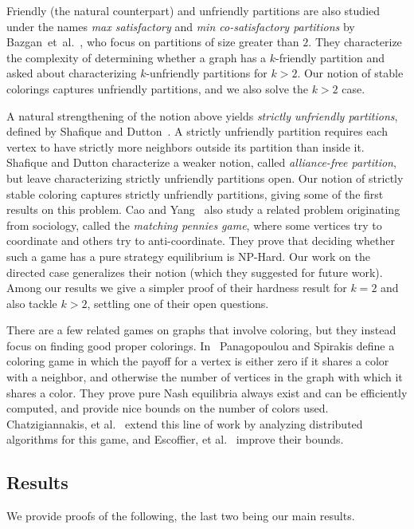 \documentclass{llncs}
\begin{document}
Friendly (the natural counterpart) and unfriendly partitions are also studied
under the names \emph{max satisfactory} and \emph{min co-satisfactory
partitions} by Bazgan~et~al.~\cite{BazganTV10}, who focus on partitions of
size greater than $2$.  They characterize the complexity of determining
whether a graph has a $k$-friendly partition and asked about characterizing
$k$-unfriendly partitions for $k > 2$.  Our notion of stable colorings captures
unfriendly partitions, and we also solve the $k>2$ case.


A natural strengthening of the notion above yields \emph{strictly
unfriendly partitions},  defined by Shafique and
Dutton~\cite{ShafiqueD09}.  A strictly unfriendly partition requires each
vertex to have strictly more neighbors outside its partition than inside it.
Shafique and Dutton characterize a weaker notion, called
\emph{alliance-free partition}, but leave characterizing strictly unfriendly
partitions open.  Our notion of strictly stable coloring captures
strictly unfriendly partitions,
giving some of the first results on this problem.
Cao and Yang~\cite{CaoY12a} also study
a related problem originating from sociology, called the
\emph{matching pennies game},
where some
vertices try to coordinate and others try to anti-coordinate.  They prove that
deciding whether such a game has a pure strategy equilibrium is NP-Hard.  Our
work on the directed case generalizes their notion (which they suggested for future work).
 Among our results we give a simpler proof of their
hardness result for $k=2$ and also tackle  $k >2$, settling one of their open
questions.

There are a few related games on graphs that involve coloring, but they instead
focus on finding good proper colorings. In~\cite{PS08} Panagopoulou and
Spirakis define a coloring game in which the payoff for a vertex is either zero
if it shares a color with a neighbor, and otherwise the number of vertices in
the graph with which it shares a color. They prove pure Nash equilibria always
exist and can be efficiently computed, and provide nice bounds
on the number of colors used. Chatzigiannakis, et al.~\cite{CKPS10} extend this line of work
by analyzing distributed algorithms for this game, and
Escoffier, et al.~\cite{EGM12} improve their bounds.


\subsection{Results}

We provide proofs of the following, the last two being our main results.
\end{document}
